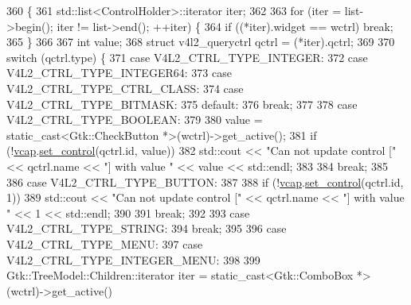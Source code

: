 \begin{DoxyCode}
360                                                                                      \{
361         std::list<ControlHolder>::iterator iter;
362 
363         \textcolor{keywordflow}{for} (iter = list->begin(); iter != list->end(); ++iter) \{
364             \textcolor{keywordflow}{if} ((*iter).widget == wctrl) \textcolor{keywordflow}{break};
365         \}
366 
367         \textcolor{keywordtype}{int} value;
368         \textcolor{keyword}{struct }v4l2\_queryctrl qctrl = (*iter).qctrl;
369 
370         \textcolor{keywordflow}{switch} (qctrl.type) \{
371             \textcolor{keywordflow}{case} V4L2\_CTRL\_TYPE\_INTEGER:
372             \textcolor{keywordflow}{case} V4L2\_CTRL\_TYPE\_INTEGER64:
373             \textcolor{keywordflow}{case} V4L2\_CTRL\_TYPE\_CTRL\_CLASS:
374             \textcolor{keywordflow}{case} V4L2\_CTRL\_TYPE\_BITMASK:
375             \textcolor{keywordflow}{default}:
376                 \textcolor{keywordflow}{break};
377 
378             \textcolor{keywordflow}{case} V4L2\_CTRL\_TYPE\_BOOLEAN:
379 
380                 value = \textcolor{keyword}{static\_cast<}Gtk::CheckButton *\textcolor{keyword}{>}(wctrl)->get\_active();
381                 \textcolor{keywordflow}{if} (!\hyperlink{class_v_s_s_s___g_u_i_1_1_v4_l_interface_a7ece61f4ccc6d5321c445e60f34e7f33}{vcap}.\hyperlink{classv4lcap_a863a15d2d66cc0b7367dcc9cba64e0bd}{set\_control}(qctrl.id, value))
382                     std::cout << \textcolor{stringliteral}{"Can not update control ["} << qctrl.name << \textcolor{stringliteral}{"] with value "} << value << 
      std::endl;
383 
384                 \textcolor{keywordflow}{break};
385 
386             \textcolor{keywordflow}{case} V4L2\_CTRL\_TYPE\_BUTTON:
387 
388                 if (!\hyperlink{class_v_s_s_s___g_u_i_1_1_v4_l_interface_a7ece61f4ccc6d5321c445e60f34e7f33}{vcap}.\hyperlink{classv4lcap_a863a15d2d66cc0b7367dcc9cba64e0bd}{set\_control}(qctrl.id, 1))
389                     std::cout << \textcolor{stringliteral}{"Can not update control ["} << qctrl.name << \textcolor{stringliteral}{"] with value "} << 1 << 
      std::endl;
390 
391                 \textcolor{keywordflow}{break};
392 
393             \textcolor{keywordflow}{case} V4L2\_CTRL\_TYPE\_STRING:
394                 \textcolor{keywordflow}{break};
395 
396             \textcolor{keywordflow}{case} V4L2\_CTRL\_TYPE\_MENU:
397             \textcolor{keywordflow}{case} V4L2\_CTRL\_TYPE\_INTEGER\_MENU:
398 
399                 Gtk::TreeModel::Children::iterator iter = static\_cast<Gtk::ComboBox *>(wctrl)->get\_active()

\end{DoxyCode}
